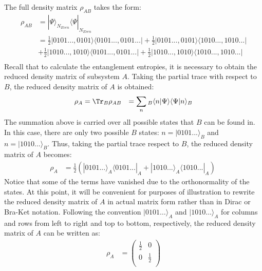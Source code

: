 The full density matrix $\rho_{AB}$ takes the form:
%
\begin{equation}
\begin{aligned}
\rho_{AB} &= | \Psi \rangle_{N_{Even}} \langle \Psi |_{N_{Even}} \\
&= \frac{1}{2} |0101...,0101\rangle \langle 0101...,0101... | + \frac{1}{2} |0101...,0101\rangle \langle 1010...,1010... |  \\
&+ \frac{1}{2} |1010...,1010\rangle \langle 0101...,0101... | + \frac{1}{2} |1010...,1010\rangle \langle 1010...,1010... |  \\
\end{aligned}
\label{eq:fullRho_EvenN}
\end{equation}
%
Recall that to calculate the entanglement entropies, it is necessary to obtain the reduced density matrix of subsystem $A$. Taking the partial trace with respect to $B$, the reduced density matrix of $A$ is obtained:
%
\begin{equation}
\begin{aligned}
\rho_{A} &= \Tr_{B} \rho_{AB} &= \sum_{n} {}_B \langle n | \Psi \rangle \langle \Psi | n \rangle_{B} \\
\end{aligned}
\end{equation}
%
The summation above is carried over all possible states that $B$ can be found in. In this case, there are only two possible $B$ states: $n = |0101...\rangle_{B}$ and $n = |1010...\rangle_{B} $. Thus, taking the partial trace respect to $B$, the reduced density matrix of $A$ becomes:
%
\begin{equation}
\begin{aligned}
\rho_{A} &= \frac{1}{2} ( | 0101... \rangle_{A} \langle 0101... |_{A} +  | 1010... \rangle_{A} \langle 1010... |_{A} )\
\end{aligned}
\end{equation}
%
Notice that some of the terms have vanished due to the orthonormality of the states. At this point, it will be convenient for purposes of illustration to rewrite the reduced density matrix of $A$ in actual matrix form rather than in Dirac or Bra-Ket notation. Following the convention $|0101\dots\rangle_{A}$ and $|1010\dots\rangle_{A}$ for columns and rows from left to right and top to bottom, respectively, the reduced density matrix of $A$ can be written as:
%
\begin{equation}
\begin{aligned}
\rho_{A} &= \begin{pmatrix}
\frac{1}{2} & 0 \\
0 & \frac{1}{2} \\
\end{pmatrix} \\
\end{aligned}
\end{equation}
